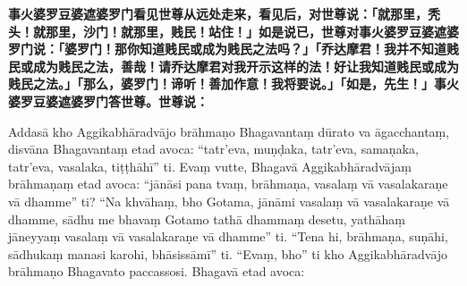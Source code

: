 \textbf{事火婆罗豆婆遮婆罗门看见世尊从远处走来，看见后，对世尊说：「就那里，秃头！就那里，沙门！就那里，贱民！站住！」如是说已，世尊对事火婆罗豆婆遮婆罗门说：「婆罗门！那你知道贱民或成为贱民之法吗？」「乔达摩君！我并不知道贱民或成为贱民之法，善哉！请乔达摩君对我开示这样的法！好让我知道贱民或成为贱民之法。」「那么，婆罗门！谛听！善加作意！我将要说。」「如是，先生！」事火婆罗豆婆遮婆罗门答世尊。世尊说：}

Addasā kho Aggikabhāradvājo brāhmaṇo Bhagavantaṃ dūrato va āgacchantaṃ, disvāna Bhagavantaṃ etad avoca: “tatr’eva, muṇḍaka, tatr’eva, samaṇaka, tatr’eva, vasalaka, tiṭṭhāhī” ti. Evaṃ vutte, Bhagavā Aggikabhāradvājaṃ brāhmaṇaṃ etad avoca: “jānāsi pana tvaṃ, brāhmaṇa, vasalaṃ vā vasalakaraṇe vā dhamme” ti? “Na khvāhaṃ, bho Gotama, jānāmi vasalaṃ vā vasalakaraṇe vā dhamme, sādhu me bhavaṃ Gotamo tathā dhammaṃ desetu, yathāhaṃ jāneyyaṃ vasalaṃ vā vasalakaraṇe vā dhamme” ti. “Tena hi, brāhmaṇa, suṇāhi, sādhukaṃ manasi karohi, bhāsissāmī” ti. “Evaṃ, bho” ti kho Aggikabhāradvājo brāhmaṇo Bhagavato paccassosi. Bhagavā etad avoca:

